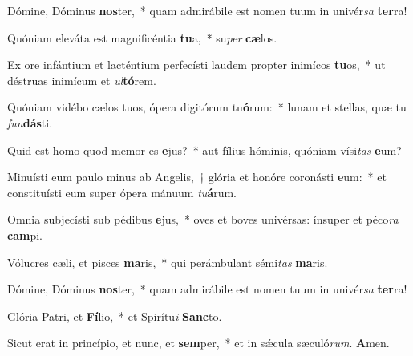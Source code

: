 \item Dómine, Dóminus \textbf{nos}ter,~* quam admirábile est nomen tuum in univér\textit{sa} \textbf{ter}ra!
\item Quóniam eleváta est magnificéntia \textbf{tu}a,~* su\textit{per} \textbf{cæ}los.
\item Ex ore infántium et lacténtium perfecísti laudem propter inimícos \textbf{tu}os,~* ut déstruas inimícum et \textit{ul}\textbf{tó}rem.
\item Quóniam vidébo cælos tuos, ópera digitórum tu\textbf{ó}rum:~* lunam et stellas, quæ tu \textit{fun}\textbf{dás}ti.
\item Quid est homo quod memor es \textbf{e}jus?~* aut fílius hóminis, quóniam vísi\textit{tas} \textbf{e}um?
\item Minuísti eum paulo minus ab Angelis,~† glória et honóre coronásti \textbf{e}um:~* et constituísti eum super ópera mánuum \textit{tu}\textbf{á}rum.
\item Omnia subjecísti sub pédibus \textbf{e}jus,~* oves et boves univérsas: ínsuper et péco\textit{ra} \textbf{cam}pi.
\item Vólucres cæli, et pisces \textbf{ma}ris,~* qui perámbulant sémi\textit{tas} \textbf{ma}ris.
\item Dómine, Dóminus \textbf{nos}ter,~* quam admirábile est nomen tuum in univér\textit{sa} \textbf{ter}ra!
\item Glória Patri, et \textbf{Fí}lio,~* et Spirítu\textit{i} \textbf{Sanc}to.
\item Sicut erat in princípio, et nunc, et \textbf{sem}per,~* et in sǽcula sæculó\textit{rum}. \textbf{A}men.
